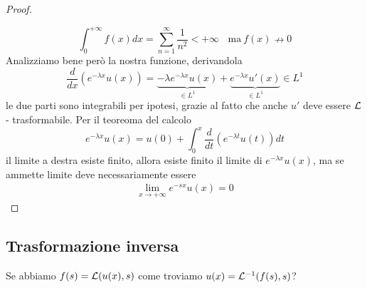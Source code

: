 \begin{proof}
\begin{figure}[htpb]
\end{figure}
\FloatBarrier

\begin{equation*}
\int^{+ \infty}_{0} f(x) dx = \sum^{\infty}_{n = 1}\frac{1}{n^{2}} < + \infty \ \ \ \ \text{ma} \ f(x) \nrightarrow 0
\end{equation*}
Analizziamo bene però la nostra funzione, derivandola
\begin{equation*}
\frac{d}{dx}\left(e^{- \lambda x} u(x)\right) = \underbrace{- \lambda e^{- \lambda x} u(x)}_{\in L^{1}} + \underbrace{e^{- \lambda x} u'(x)}_{\in L^{1}} \in L^{1}
\end{equation*}
le due parti sono integrabili per ipotesi, grazie al fatto che anche $u'$ deve essere $\mathcal{L}$ - trasformabile. Per il teoreoma del calcolo
\begin{equation*}
e^{- \lambda x} u(x) = u(0) + \int^{x}_{0}\frac{d}{dt}\left(e^{- \lambda t} u(t)\right) dt
\end{equation*}
il limite a destra esiste finito, allora esiste finito il limite di $e^{- \lambda x} u(x)$, ma se ammette limite deve necessariamente essere
\begin{gather*}
\lim_{x\rightarrow + \infty} e^{- sx} u(x) = 0
\end{gather*}
\end{proof}

\subsection{Trasformazione inversa}

Se abbiamo $f(s) = \mathcal{L}(u(x), s)$ come troviamo $u(x) = \mathcal{L}^{- 1}(f(s), s)$?


